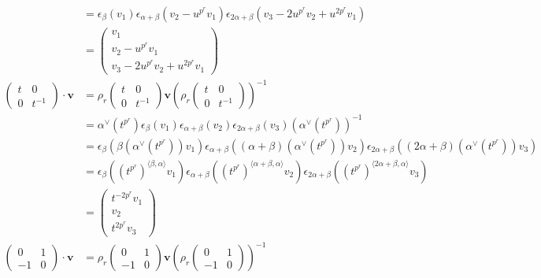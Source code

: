 \begin{align*}
																																						&=
																																						\epsilon_ \beta (v_1)  \epsilon_{\alpha+\beta}(v_2-u^{p^r}v_1) \epsilon_{2\alpha+\beta}(v_3-2u^{p^r}v_2 + u^{2p^r}v_1)\\
																																							&= \left(\begin{matrix} v_1 \\ v_2-u^{p^r}v_1 \\ v_3-2u^{p^r}v_2 + u^{2p^r}v_1 \end{matrix}\right) \\
																																							\left(\begin{matrix} t & 0 \\ 0 & t^{-1}\end{matrix}\right) \cdot \mathbf{v} 
																																							&=
																																							\rho_r\left(\begin{matrix} t & 0 \\ 0 & t^{-1}\end{matrix}\right) \mathbf{v} \left( \rho_r\left(\begin{matrix} t & 0 \\ 0 & t^{-1}\end{matrix}\right)\right)^{-1} \\
	&= 
\alpha^\vee(t^{p^r}) 
	\epsilon_ \beta (v_1)
\epsilon_{\alpha+\beta}(v_2)
\epsilon_{2\alpha+\beta}(v_3) 
	(\alpha^\vee(t^{p^r}))^{-1} \\
	&= 
\epsilon_\beta \left(\beta(\alpha^\vee(t^{p^r}))v_1\right)
\epsilon_{\alpha+\beta} \left((\alpha+\beta)(\alpha ^\vee(t^{p^r}))v_2 \right)
	\epsilon_{2\alpha+\beta} \left((2\alpha+\beta)(\alpha ^\vee(t^{p^r}))v_3 \right)\\
	&= 
\epsilon_ \beta \left((t^{p^r})^{\langle \beta, \alpha \rangle}v_1 \right)
\epsilon_{\alpha+\beta} \left((t^{p^r})^{\langle \alpha+\beta, \alpha \rangle}v_2 \right)
	\epsilon_{2\alpha+\beta} \left((t^{p^r})^{\langle 2\alpha+\beta, \alpha \rangle}v_3 \right)\\
		&= 
		\left(\begin{matrix} t^{-2p^r}v_1 \\ v_2\\ t^{2p^r} v_3 \end{matrix}\right) \\
			\left(\begin{matrix} 0 & 1 \\ -1 & 0 \end{matrix}\right) \cdot \mathbf{v} 
			&=
			\rho_r\left(\begin{matrix} 0 & 1 \\ -1 & 0\end{matrix}\right) \mathbf{v}\left( \rho_r\left(\begin{matrix} 0 & 1 \\ -1 & 0\end{matrix}\right)\right)^{-1} \\

\end{align*}
